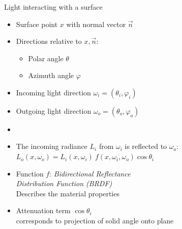 \documentclass[utf8,stillsansserifmath,fleqn,t]{beamer}
\begin{document}
\begin{frame}[label=radiometry-light-at-surface]
\frametitle{\insertsection}
Light interacting with a surface\\
\begin{itemize}
\item Surface point $x$ with normal vector $\vec{n}$
\item Directions relative to $x, \vec{n}$:
    \begin{itemize}
    \item Polar angle $\theta$
    \item Azimuth angle $\varphi$
    \end{itemize}
\item Incoming light direction $\omega_i=(\theta_i,\varphi_i)$
\item Outgoing light direction $\omega_o=(\theta_o,\varphi_o)$
\item[~] ~
\item The incoming radiance $L_i$ from $\omega_i$ is reflected to $\omega_o$:\\
    $L_o(x, \omega_o) = L_i(x,\omega_i)~f(x,\omega_i,\omega_o)\cos\theta_i$
\item Function $f$: \emph{Bidirectional Reflectance\\ Distribution Function
(BRDF)}\\Describes the material properties
\item Attenuation term $\cos\theta_i$\\
corresponds to projection of solid angle onto plane
\end{itemize}
\end{frame}
\end{document}
